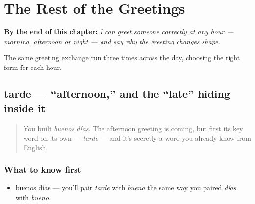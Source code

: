 
\chapter{The Rest of the Greetings}
\label{ch:greetings}

\begin{chapteropening}
\textbf{By the end of this chapter:} \emph{I can greet someone correctly at any hour — morning, afternoon or night — and say why the greeting changes shape.}

The same greeting exchange run three times across the day, choosing the right form for each hour.
\end{chapteropening}

\section[la tarde]{tarde — \textquotedblleft{}afternoon,\textquotedblright{} and the \textquotedblleft{}late\textquotedblright{} hiding inside it}

\label{lesson:ES-C02-tarde}



\begin{quote}
You built \emph{buenos días}. The afternoon greeting is coming, but first its key word on its own — \emph{tarde} — and it's secretly a word you already know from English.
\end{quote}

\subsection*{What to know first}
\begin{itemize}
\raggedright
  \item buenos días — you'll pair \emph{tarde} with \emph{buena} the same way you paired \emph{días} with \emph{bueno}.
\end{itemize}

